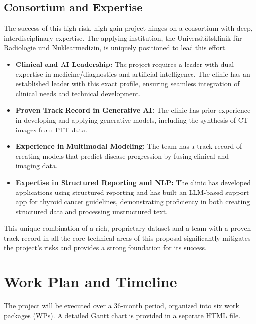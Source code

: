 \documentclass[11pt, a4paper]{article}
\begin{document}
\subsection{Consortium and Expertise}
The success of this high-risk, high-gain project hinges on a consortium with deep, interdisciplinary expertise. The applying institution, the Universitätsklinik für Radiologie und Nuklearmedizin, is uniquely positioned to lead this effort.
\begin{itemize}
    \item \textbf{Clinical and AI Leadership:} The project requires a leader with dual expertise in medicine/diagnostics and artificial intelligence. The clinic has an established leader with this exact profile, ensuring seamless integration of clinical needs and technical development.
    \item \textbf{Proven Track Record in Generative AI:} The clinic has prior experience in developing and applying generative models, including the synthesis of CT images from PET data.
    \item \textbf{Experience in Multimodal Modeling:} The team has a track record of creating models that predict disease progression by fusing clinical and imaging data.
    \item \textbf{Expertise in Structured Reporting and NLP:} The clinic has developed applications using structured reporting and has built an LLM-based support app for thyroid cancer guidelines, demonstrating proficiency in both creating structured data and processing unstructured text.
\end{itemize}
This unique combination of a rich, proprietary dataset and a team with a proven track record in all the core technical areas of this proposal significantly mitigates the project's risks and provides a strong foundation for its success.

\section{Work Plan and Timeline}
The project will be executed over a 36-month period, organized into six work packages (WPs). A detailed Gantt chart is provided in a separate HTML file.
\end{document}
